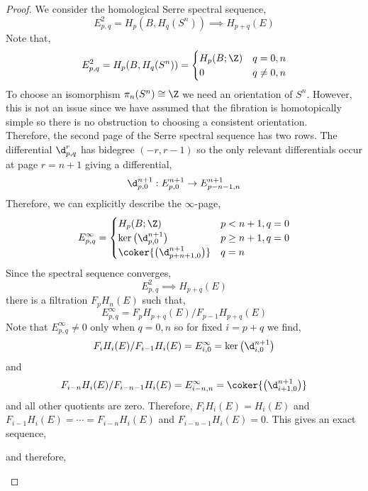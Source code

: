 \documentclass[12pt]{extarticle}
\begin{document}
\begin{proof}
We consider the homological Serre spectral sequence,
\[ E^2_{p,q} = H_p(B, H_q(S^n)) \implies H_{p + q}(E) \]
Note that,
\[ E^2_{p,q} = H_p(B, H_q(S^n)) = 
\begin{cases}
H_p(B; \Z) & q = 0, n
\\
0 & q \neq 0, n
\end{cases} \]
To choose an isomorphism $\pi_n(S^n) \cong \Z$ we need an orientation of $S^n$. However, this is not an issue since we have assumed that the fibration is homotopically simple so there is no obstruction to choosing a consistent orientation. 
\bigskip\\
Therefore, the second page of the Serre spectral sequence has two rows. The differential $\d^r_{p, q}$ has bidegree $(- r, r - 1)$ so the only relevant differentials occur at page $r = n + 1$ giving a differential,
\[ \d^{n+1}_{p, 0} : E^{n+1}_{p,0} \to E^{n+1}_{p - n - 1, n} \]
Therefore, we can explicitly describe the $\infty$-page,
\[ E^\infty_{p, q} = 
\begin{cases}
H_p(B; \Z) & p < n + 1, q = 0
\\
\ker{\left( \d^{n+1}_{p, 0} \right)} & p \ge n + 1, q = 0
\\
\coker{\left( \d^{n+1}_{p + n + 1, 0} \right)} & q = n
\end{cases} \]
Since the spectral sequence converges,
\[  E^2_{p,q} \implies H_{p + q}(E) \]
there is a filtration $F_p H_n(E)$ such that,
\[ E^\infty_{p, q} = F_p H_{p+q}(E) / F_{p-1} H_{p+q}(E) \] 
Note that $E^\infty_{p, q} \neq 0$ only when $q = 0, n$ so for fixed $i = p + q$ we find,
\[ F_{i} H_{i}(E) / F_{i-1} H_{i}(E) = E^\infty_{i, 0} = \ker{\left( \d^{n+1}_{i, 0} \right)} \] 
and
\[ F_{i - n} H_i(E) / F_{i - n - 1} H_{i}(E) = E^\infty_{i-n, n} = \coker{\left( \d^{n+1}_{i + 1, 0} \right) } \]
and all other quotients are zero. Therefore, $F_i H_i(E) = H_i(E)$ and $F_{i-1} H_i(E) = \cdots = F_{i - n} H_i(E)$ and $F_{i - n - 1} H_i(E) = 0$. This gives an exact sequence, 
\begin{center}
\end{center}
and therefore,
\begin{center}
\end{center}
\end{proof}
\end{document}

